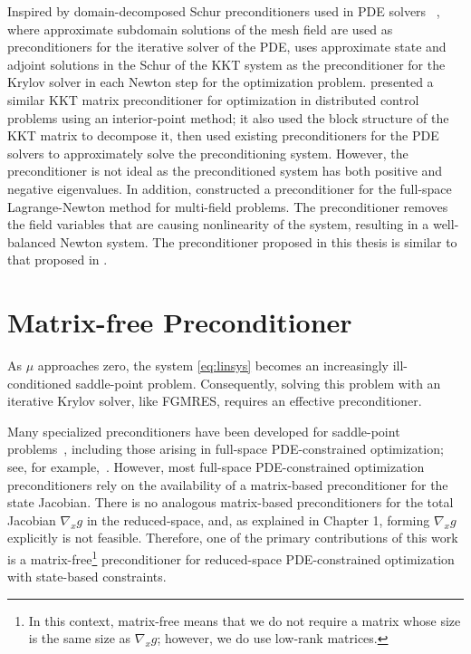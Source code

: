 Inspired by domain-decomposed Schur preconditioners used in PDE solvers~\cite{keyes_domain} ,  where approximate subdomain solutions of the mesh field are used as preconditioners for the iterative solver of the PDE, \cite{DBLP:journals/siamsc/BirosG05} uses approximate state and adjoint solutions in the Schur of the KKT system as the preconditioner for the Krylov solver in each Newton step for the optimization problem. \cite{pc_kkt_control} presented a similar KKT matrix preconditioner for  optimization in distributed control problems using an interior-point method; it also used the block structure of the KKT matrix to decompose it, then used existing preconditioners for the PDE solvers to approximately solve the preconditioning system. However, the preconditioner is not ideal as the preconditioned system has both positive and negative eigenvalues. In addition, \cite{doi:10.1137/15M104075X} constructed a preconditioner for the full-space Lagrange-Newton method for multi-field problems. The preconditioner removes the field variables that are causing nonlinearity of the system, resulting in a well-balanced Newton system. The preconditioner proposed in this thesis is similar to  that proposed in \cite{pc_kkt_control}. 


\section{Matrix-free Preconditioner}\label{sec:matfreepc}
As $\mu$ approaches zero, the system \eqref{eq:linsys} becomes an increasingly
ill-conditioned saddle-point problem.  Consequently, solving this problem with
an iterative Krylov solver, like FGMRES, requires an effective preconditioner.  

Many specialized preconditioners have been developed for saddle-point
problems~\cite{benzi2005numerical}, including those arising in full-space
PDE-constrained optimization; see, for example,~\cite{Rees2010optimal}.
However, most full-space PDE-constrained optimization preconditioners rely on
the availability of a matrix-based preconditioner for the state Jacobian. There
is no analogous matrix-based preconditioners for the total Jacobian $\nabla_x g$
in the reduced-space, and, as explained in Chapter 1, forming $\nabla_x
g$ explicitly is not feasible.  Therefore, one of the primary contributions of
this work is a matrix-free\footnote{In this context, matrix-free means that we
  do not require a matrix whose size is the same size as $\nabla_x g$; however,
  we do use low-rank matrices.} preconditioner for reduced-space PDE-constrained
optimization with state-based constraints.

